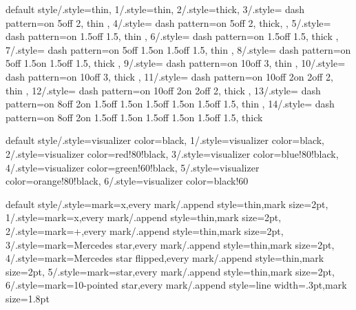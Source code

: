 {
  default style/.style=thin,
  1/.style=thin,
  2/.style=thick,
  3/.style={
    dash pattern=on 5\pgflinewidth off 2\pgflinewidth,
    thin
  },
  4/.style={
    dash pattern=on 5\pgflinewidth off 2\pgflinewidth,
    thick,
  },
  5/.style={
    dash pattern=on 1.5\pgflinewidth off 1.5\pgflinewidth,
    thin
  },
  6/.style={
    dash pattern=on 1.5\pgflinewidth off 1.5\pgflinewidth,
    thick
  },
  7/.style={
    dash pattern=on 5\pgflinewidth off 1.5\pgflinewidth on
    1.5\pgflinewidth off 1.5\pgflinewidth,
    thin
  },
  8/.style={
    dash pattern=on 5\pgflinewidth off 1.5\pgflinewidth on
    1.5\pgflinewidth off 1.5\pgflinewidth,
    thick
  },
  9/.style={
    dash pattern=on 10\pgflinewidth off 3\pgflinewidth,
    thin
  },
  10/.style={
    dash pattern=on 10\pgflinewidth off 3\pgflinewidth,
    thick
  },
  11/.style={
    dash pattern=on 10\pgflinewidth off 2\pgflinewidth on
    2\pgflinewidth off 2\pgflinewidth,
    thin
  },
  12/.style={
    dash pattern=on 10\pgflinewidth off 2\pgflinewidth on
    2\pgflinewidth off 2\pgflinewidth,
    thick
  },
  13/.style={
    dash pattern=on 8\pgflinewidth off 2\pgflinewidth on
    1.5\pgflinewidth off 1.5\pgflinewidth on 1.5\pgflinewidth off
    1.5\pgflinewidth on 1.5\pgflinewidth off 1.5\pgflinewidth,
    thin
  },
  14/.style={
    dash pattern=on 8\pgflinewidth off 2\pgflinewidth on
    1.5\pgflinewidth off 1.5\pgflinewidth on 1.5\pgflinewidth off
    1.5\pgflinewidth on 1.5\pgflinewidth off 1.5\pgflinewidth,
    thick
  }
}%


{
  default style/.style={visualizer color=black},
  1/.style={visualizer color=black},
  2/.style={visualizer color=red!80!black},
  3/.style={visualizer color=blue!80!black},
  4/.style={visualizer color=green!60!black},
  5/.style={visualizer color=orange!80!black},
  6/.style={visualizer color=black!60}
}%


{
  default style/.style={mark=x,every mark/.append style=thin,mark size=2pt},
  1/.style={mark=x,every mark/.append style=thin,mark size=2pt},
  2/.style={mark=+,every mark/.append style=thin,mark size=2pt},
  3/.style={mark=Mercedes star,every mark/.append style=thin,mark size=2pt},
  4/.style={mark=Mercedes star flipped,every mark/.append style=thin,mark size=2pt},
  5/.style={mark=star,every mark/.append style=thin,mark size=2pt},
  6/.style={mark=10-pointed star,every mark/.append style={line width=.3pt,mark size=1.8pt}}
}%


